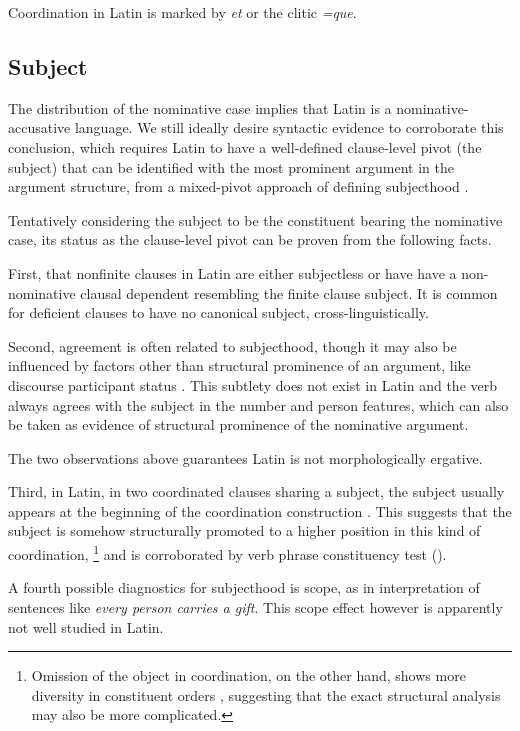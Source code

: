 \documentclass[a4paper, oneside, 12pt]{report}
\newcommand*{\citesec}[1]{\S~{#1}}
\newcommand{\form}[1]{\emph{#1}}
\begin{document}
Coordination in Latin is marked by \form{et} or the clitic \form{=que}.


\subsection{Subject}\label{sec:grammatical.clause.subject} 

The distribution of the nominative case implies that Latin is a nominative-accusative language.
We still ideally desire syntactic evidence to corroborate this conclusion,
which requires Latin to have a well-defined clause-level pivot (the subject)
that can be identified with the most prominent argument in the argument structure,
from a mixed-pivot approach of defining subjecthood \citep{aldridge2008generative}.

Tentatively considering the subject to be the constituent bearing the nominative case,
its status as the clause-level pivot can be proven from the following facts.

First, that nonfinite clauses in Latin are either subjectless or have have a non-nominative clausal dependent resembling the finite clause subject.
It is common for deficient clauses to have no canonical subject, cross-linguistically.

Second, agreement is often related to subjecthood, though it may also be influenced by factors other than structural prominence of an argument,
like discourse participant status \citep{oxford2017inverse}.
This subtlety does not exist in Latin and the verb always agrees with the subject in the number and person features,
which can also be taken as evidence of structural prominence of the nominative argument.

The two observations above guarantees Latin is not morphologically ergative.

Third, in Latin, in two coordinated clauses sharing a subject,
the subject usually appears at the beginning of the coordination construction 
\citep[\citesec{19.5}]{pinkster2}.
This suggests that the subject is somehow structurally 
promoted to a higher position in this kind of coordination,%
\footnote{
    Omission of the object in coordination, on the other hand,
    shows more diversity in constituent orders \citep[\citesec{19.6}]{pinkster2},
    suggesting that the exact structural analysis may also be more complicated.
}
and is corroborated by verb phrase constituency test ().

A fourth possible diagnostics for subjecthood is scope, as in interpretation of sentences like \form{every person carries a gift}.
This scope effect however is apparently not well studied in Latin.
\end{document}
